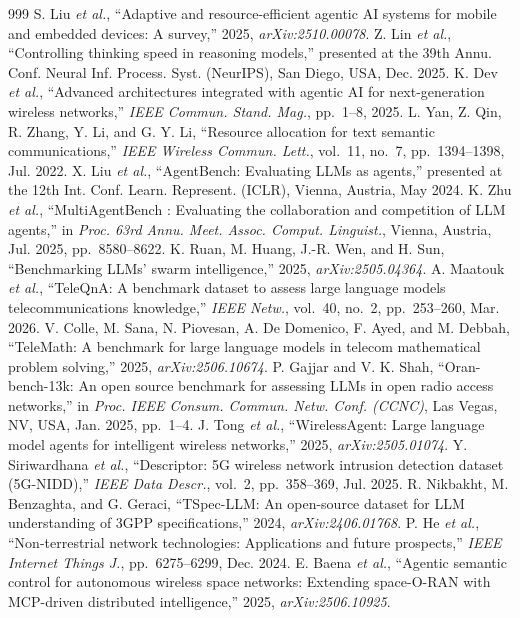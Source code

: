 \begin{thebibliography}{999}
 S. Liu \emph{et al.}, ``Adaptive and resource-efficient agentic AI systems for mobile and embedded devices: A survey,'' 2025, \emph{arXiv:2510.00078}.
 Z. Lin \emph{et al.}, ``Controlling thinking speed in reasoning models,'' presented at the 39th Annu. Conf. Neural Inf. Process. Syst. (NeurIPS), San Diego, USA, Dec. 2025.
 K. Dev \emph{et al.}, ``Advanced architectures integrated with agentic AI for next-generation wireless networks,'' \emph{IEEE Commun. Stand. Mag.}, pp.~1--8, 2025.
 L. Yan, Z. Qin, R. Zhang, Y. Li, and G. Y. Li, ``Resource allocation for text semantic communications,'' \emph{IEEE Wireless Commun. Lett.}, vol.~11, no.~7, pp.~1394--1398, Jul. 2022.
 X. Liu \emph{et al.}, ``AgentBench: Evaluating LLMs as agents,'' presented at the 12th Int. Conf. Learn. Represent. (ICLR), Vienna, Austria, May 2024.
 K. Zhu \emph{et al.}, ``MultiAgentBench : Evaluating the collaboration and competition of LLM agents,'' in \emph{Proc. 63rd Annu. Meet. Assoc. Comput. Linguist.}, Vienna, Austria, Jul. 2025, pp.~8580--8622.
 K. Ruan, M. Huang, J.-R. Wen, and H. Sun, ``Benchmarking LLMs' swarm intelligence,'' 2025, \emph{arXiv:2505.04364}.
 A. Maatouk \emph{et al.}, ``TeleQnA: A benchmark dataset to assess large language models telecommunications knowledge,'' \emph{IEEE Netw.}, vol.~40, no.~2, pp.~253--260, Mar. 2026.
 V. Colle, M. Sana, N. Piovesan, A. De Domenico, F. Ayed, and M. Debbah, ``TeleMath: A benchmark for large language models in telecom mathematical problem solving,'' 2025, \emph{arXiv:2506.10674}.
 P. Gajjar and V. K. Shah, ``Oran-bench-13k: An open source benchmark for assessing LLMs in open radio access networks,'' in \emph{Proc. IEEE Consum. Commun. Netw. Conf. (CCNC)}, Las Vegas, NV, USA, Jan. 2025, pp.~1--4.
 J. Tong \emph{et al.}, ``WirelessAgent: Large language model agents for intelligent wireless networks,'' 2025, \emph{arXiv:2505.01074}.
 Y. Siriwardhana \emph{et al.}, ``Descriptor: 5G wireless network intrusion detection dataset (5G-NIDD),'' \emph{IEEE Data Descr.}, vol.~2, pp.~358--369, Jul. 2025.
 R. Nikbakht, M. Benzaghta, and G. Geraci, ``TSpec-LLM: An open-source dataset for LLM understanding of 3GPP specifications,'' 2024, \emph{arXiv:2406.01768}.
 P. He \emph{et al.}, ``Non-terrestrial network technologies: Applications and future prospects,'' \emph{IEEE Internet Things J.}, pp.~6275--6299, Dec. 2024.
 E. Baena \emph{et al.}, ``Agentic semantic control for autonomous wireless space networks: Extending space-O-RAN with MCP-driven distributed intelligence,'' 2025, \emph{arXiv:2506.10925}.

\end{thebibliography}

